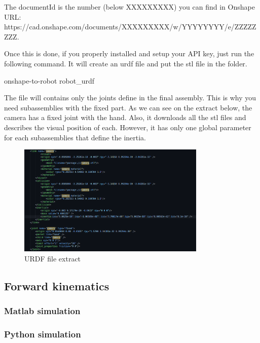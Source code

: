 The documentId is the number (below XXXXXXXXX) you can find in Onshape URL:
\\https://cad.onshape.com/documents/XXXXXXXXX/w/YYYYYYYY/e/ZZZZZZZZ.

\bigbreak

Once this is done, if you properly installed and setup your API key, just run the following command. It will create an urdf file and put the stl file in the folder.
\begin{commandshell}
    onshape-to-robot robot_urdf
\end{commandshell} 

\bigbreak

The file will contains only the joints define in the final assembly. This is why you need subassemblies with the fixed part. As we can see on the extract below, the camera has a fixed joint with the hand. Also, it downloads all the stl files and describes the visual position of each. However, it has only one global parameter for each subassemblies that define the inertia.

\begin{figure}[ht]
    \centering
    \includegraphics[width=0.8\textwidth]{images/urdf.png}
    \caption{URDF file extract}
    \label{fig:mesh11}
\end{figure}
\FloatBarrier

\subsection{Forward kinematics}
\subsubsection{Matlab simulation}

\subsubsection{Python simulation}

